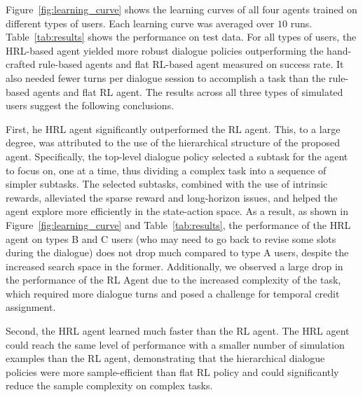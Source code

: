\documentclass[11pt,letterpaper]{article}
\begin{document}
Figure~\ref{fig:learning_curve} shows the learning curves of all four agents trained on different types of users. Each learning curve was averaged over $10$ runs. Table~\ref{tab:results} shows the performance on test data. For all types of users, the HRL-based agent yielded more robust dialogue policies outperforming the hand-crafted rule-based agents and flat RL-based agent measured on success rate.  It also needed fewer turns per dialogue session to accomplish a task than the rule-based agents and flat RL agent.
The results across all three types of simulated users suggest the following conclusions.

First, he HRL agent significantly outperformed the RL agent. This, to a large degree, was attributed to the use of the hierarchical structure of the proposed agent. Specifically, the top-level dialogue policy selected a subtask for the agent to focus on, one at a time, thus dividing a complex task into a sequence of simpler subtasks. The selected subtasks, combined with the use of intrinsic rewards, alleviated the sparse reward and long-horizon issues, and helped the agent explore more efficiently in the state-action space. As a result, as shown in Figure~\ref{fig:learning_curve} and Table~\ref{tab:results}, the performance of the HRL agent on types B and C users (who may need to go back to revise some slots during the dialogue) does not drop much compared to type A users, despite the increased search space in the former. Additionally, we observed a large drop in the performance of the RL Agent due to the increased complexity of the task, which required more dialogue turns and posed a challenge for temporal credit assignment.

Second, the HRL agent learned much faster than the RL agent. The HRL agent could reach the same level of performance with a smaller number of simulation examples than the RL agent, %
demonstrating that the hierarchical dialogue policies were more sample-efficient than flat RL policy and could significantly reduce the sample complexity on complex tasks.
\end{document}
